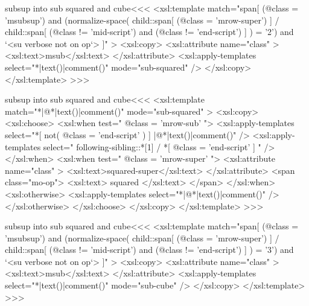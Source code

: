 \documentclass{article}
\begin{document}
\<subsup into sub squared and cube\><<<
<xsl:template match="span[
    (@class = 'msubsup') 
  and
    (normalize-space(
      child::span[ (@class = 'mrow-super') ] 
        / child::span[ (@class != 'mid-script')
                       and
                       (@class != 'end-script')
                     ]
     ) = '2')
  and `<su verbose not on op`>
]" >
   <xsl:copy>
      <xsl:attribute name="class" >
         <xsl:text>msub</xsl:text>
      </xsl:attribute>
      <xsl:apply-templates select="*|text()|comment()" 
                           mode="sub-squared" />
   </xsl:copy>
</xsl:template> 
>>>



\<subsup into sub squared and cube\><<<
<xsl:template match="*|@*|text()|comment()" 
                           mode="sub-squared" >
   <xsl:copy>
     <xsl:choose>
        <xsl:when test=" @class = 'mrow-sub' ">
           <xsl:apply-templates select="*[
                       not( @class = 'end-script' )
                     ]
                           |@*|text()|comment()" />
           <xsl:apply-templates select="
               following-sibling::*[1] / *[
                        @class = 'end-script' 
                  ] " />
        </xsl:when>  
        <xsl:when test=" @class = 'mrow-super' ">
           <xsl:attribute name="class" >
               <xsl:text>squared-super</xsl:text>
           </xsl:attribute>
           <span class="mo-op">
             <xsl:text> squared </xsl:text>
           </span>
        </xsl:when>  
        <xsl:otherwise>
           <xsl:apply-templates select="*|@*|text()|comment()" />
        </xsl:otherwise>
     </xsl:choose>
   </xsl:copy>
</xsl:template> 
>>>


\<subsup into sub squared and cube\><<<
<xsl:template match="span[
    (@class = 'msubsup') 
  and
    (normalize-space(
      child::span[ (@class = 'mrow-super') ] 
        / child::span[ (@class != 'mid-script')
                       and
                       (@class != 'end-script')
                     ]
     ) = '3')
  and `<su verbose not on op`>
]" >
   <xsl:copy>
      <xsl:attribute name="class" >
         <xsl:text>msub</xsl:text>
      </xsl:attribute>
      <xsl:apply-templates select="*|text()|comment()" 
                           mode="sub-cube" />
   </xsl:copy>
</xsl:template> 
>>>
\end{document}
